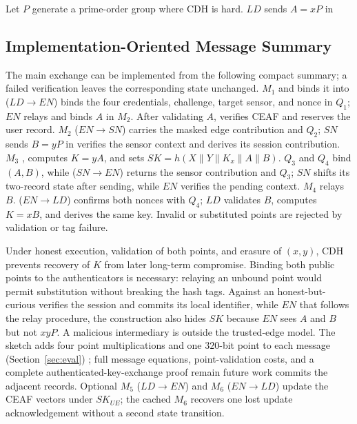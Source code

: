 \documentclass[cmc,article,submit,moreauthors,pdftex]{Definitions/tsp}
\newcommand{\cc}{\mathbin{\|}}
\providecommand{\DIFadd}[1]{{\protect\color{blue} \sf #1}} %
\providecommand{\DIFdel}[1]{{\protect\color{red} \scriptsize #1}} %
\providecommand{\DIFaddbegin}{} %
\providecommand{\DIFaddend}{} %
\providecommand{\DIFdelbegin}{} %
\providecommand{\DIFdelend}{} %
\begin{document}
\DIFdel{Let $P$ generate a prime-order group where CDH is hard. $LD$ sends $A=xP$ in }\DIFdelend %
\DIFaddbegin \subsection{Implementation-Oriented Message Summary}
\DIFadd{The main exchange can be implemented from the following compact summary; a failed verification leaves the corresponding state unchanged. }\DIFaddend $M_1$ \DIFdelbegin \DIFdel{and binds it into }\DIFdelend \DIFaddbegin \DIFadd{($LD\rightarrow EN$) binds the four credentials, challenge, target sensor, and nonce in }\DIFaddend $Q_1$; $EN$ \DIFdelbegin \DIFdel{relays and binds $A$ in $M_2$. After validating $A$, }\DIFdelend \DIFaddbegin \DIFadd{verifies CEAF and reserves the user record. $M_2$ ($EN\rightarrow SN$) carries the masked edge contribution and $Q_2$; }\DIFaddend $SN$ \DIFdelbegin \DIFdel{sends $B=yP$ in }\DIFdelend \DIFaddbegin \DIFadd{verifies the sensor context and derives its session contribution. }\DIFaddend $M_3$ \DIFdelbegin \DIFdel{, computes $K=yA$, and sets $SK=h(X\cc Y\cc K_x\cc A\cc B)$. $Q_3$ and $Q_4$ bind $(A,B)$, while }\DIFdelend \DIFaddbegin \DIFadd{($SN\rightarrow EN$) returns the sensor contribution and $Q_3$; $SN$ shifts its two-record state after sending, while $EN$ verifies the pending context. }\DIFaddend $M_4$ \DIFdelbegin \DIFdel{relays $B$. }\DIFdelend \DIFaddbegin \DIFadd{($EN\rightarrow LD$) confirms both nonces with $Q_4$; }\DIFaddend $LD$ \DIFdelbegin \DIFdel{validates $B$, computes $K=xB$, and derives the same key. Invalid or substituted points are rejected by validation or tag failure.
}%

\DIFdel{Under honest execution, validation of both points, and erasure of $(x,y)$, CDH prevents recovery of $K$ from later long-term compromise. Binding both public points to the authenticators is necessary: relaying an unbound point would permit substitution without breaking the hash tags. Against an honest-but-curious }\DIFdelend \DIFaddbegin \DIFadd{verifies the session and commits its local identifier, while }\DIFaddend $EN$ \DIFdelbegin \DIFdel{that follows the relay procedure, the construction also hides $SK$ because $EN$ sees $A$ and $B$ but not $xyP$. A malicious intermediary is outside the trusted-edge model. The sketch adds four point multiplications and one $320$-bit point to each message (Section~\ref{sec:eval}) ; full message equations, point-validation costs, and a complete authenticated-key-exchange proof remain future work}\DIFdelend \DIFaddbegin \DIFadd{commits the adjacent records. Optional $M_5$ ($LD\rightarrow EN$) and $M_6$ ($EN\rightarrow LD$) update the CEAF vectors under $SK_{UE}$; the cached $M_6$ recovers one lost update acknowledgement without a second state transition}\DIFaddend .
\end{document}
